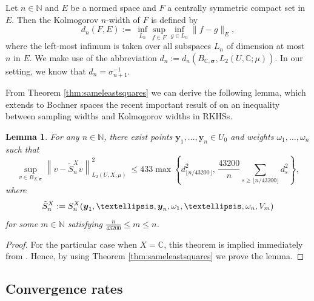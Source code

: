 \documentclass[11pt]{article}
\newtheorem{lemma}{Lemma}[section]
\numberwithin{equation}{section}
\theoremstyle{definition}
\theoremstyle{remark}
\newcommand{\brab}[1]{\left\{#1\right\}}
\newcommand{\norm}[2]{\left\|{#1}\right\|_{#2}}
\newcommand{\by}{{\boldsymbol{y}}}
\newcommand{\bsigma}{{\boldsymbol{\sigma}}}
\def\NN{{\mathbb N}}
\def\CC{{\mathbb C}}
\def\CC{{\mathbb C}}
\def\NN{{\mathbb N}}
\def\CC{{\mathbb C}}
\def\NN{{\mathbb N}}
\begin{document}
Let $n \in \NN$ and $E$ be a normed space and $F$ a centrally symmetric compact set in $E$.
Then the Kolmogorov $n$-width of $F$ is defined by
\begin{equation*}
	d_n(F,E):= \ \inf_{L_{n}}\sup_{f\in F}\inf_{g\in L_n}\|f-g\|_E,
\end{equation*}
where the left-most infimum is taken over all subspaces $L_{n}$ of dimension at most $n$ in $E$.
We make use of the abbreviation $d_n := d_n(B_{\CC,\bsigma},L_2(U,\CC;\mu))$.
In our setting, we know that $d_n = \sigma_{n+1}^{-1}$.



From Theorem \ref{thm:sameleastsquares} we can derive the following lemma, which extends to Bochner spaces the recent important result of \cite[Theorem~1]{DKU2023} {on an inequality} between sampling widths and Kolmogorov widths in RKHSs.



\begin{lemma}\label{lemma:leastsquaresbounds(iii)}	
	For any $n\in \NN$, there exist points 
	$\by_1, \dots, \by_n\in U_0$ and weights  $\omega_1, \dots, \omega_n$ such that   
	\begin{equation}\nonumber
		\sup_{v\in B_{X,\bsigma}} \norm{v - \tilde{S}_n^X v}{L_2(U,X;\mu)}^2
        \ \le 433 \max\brab{d_{\lfloor n/43200\rfloor}^2, \, \frac{43200}{n} \sum_{s \ge \lfloor n/43200\rfloor } d_s^2},
	\end{equation}
	where 
    \begin{equation}\label{tilde{S}_n^X:=}
        \tilde{S}_n^X
        := 	
        S_n^X(\by_1, \dots, \by_n, \omega_1, \dots, \omega_n, V_m)
    \end{equation}
    for some $m\in\NN$ satisfying $\frac{n}{43200} \le m \le n$.
\end{lemma}

\begin{proof}
For the particular case when $X = \CC$, this theorem
is implied immediately from \cite[Theorem~23]{DKU2023}. Hence, by 
using Theorem \ref{thm:sameleastsquares} we prove the lemma.
	\hfill
\end{proof}


\subsection{Convergence rates}
\end{document}
